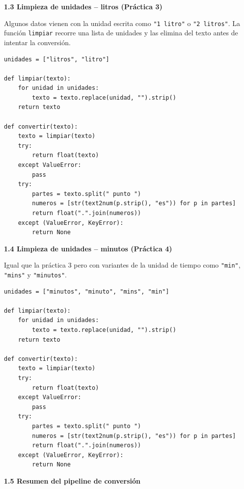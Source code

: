\documentclass[12pt,oneside]{article}
\newcommand{\seccion}[1]{%
  \vspace{2mm}%
  \noindent\textbf{#1}%
  \vspace{1mm}%
}
\begin{document}
\seccion{1.3 Limpieza de unidades -- litros (Práctica 3)}

Algunos datos vienen con la unidad escrita como \texttt{"1 litro"} o \texttt{"2 litros"}.
La función \texttt{limpiar} recorre una lista de unidades y las elimina del texto
antes de intentar la conversión.

\begin{lstlisting}[caption={Limpieza de unidades -- Práctica 3}]
unidades = ["litros", "litro"]

def limpiar(texto):
    for unidad in unidades:
        texto = texto.replace(unidad, "").strip()
    return texto

def convertir(texto):
    texto = limpiar(texto)
    try:
        return float(texto)
    except ValueError:
        pass
    try:
        partes = texto.split(" punto ")
        numeros = [str(text2num(p.strip(), "es")) for p in partes]
        return float(".".join(numeros))
    except (ValueError, KeyError):
        return None
\end{lstlisting}

\seccion{1.4 Limpieza de unidades -- minutos (Práctica 4)}

Igual que la práctica 3 pero con variantes de la unidad de tiempo como
\texttt{"min"}, \texttt{"mins"} y \texttt{"minutos"}.

\begin{lstlisting}[caption={Limpieza de unidades -- Práctica 4}]
unidades = ["minutos", "minuto", "mins", "min"]

def limpiar(texto):
    for unidad in unidades:
        texto = texto.replace(unidad, "").strip()
    return texto

def convertir(texto):
    texto = limpiar(texto)
    try:
        return float(texto)
    except ValueError:
        pass
    try:
        partes = texto.split(" punto ")
        numeros = [str(text2num(p.strip(), "es")) for p in partes]
        return float(".".join(numeros))
    except (ValueError, KeyError):
        return None
\end{lstlisting}

\seccion{1.5 Resumen del pipeline de conversión}
\end{document}
